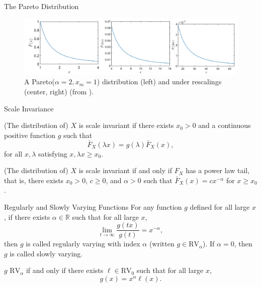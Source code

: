 \documentclass{beamer}
\def\R{\mathbb R}
\def\RV{\text{RV}}
\begin{document}
\begin{frame}{The Pareto Distribution}
    \begin{figure}[h!]
        \centering
        \includegraphics[scale=0.3]{scaled_paretos.png}
        \caption{A Pareto($\alpha = 2, x_m = 1$) distribution (left) and under rescalings (center, right) (from \cite{nair2022thef}).}
        \label{fig:scaled_paretos}
    \end{figure}
\end{frame}

\begin{frame}{Scale Invariance}
    \begin{definition}
        (The distribution of) $X$ is scale invariant if there exists $x_0 > 0$ and a continuous positive function $g$ such that
        \[
        \bar{F}_X(\lambda x) = g(\lambda)\bar{F}_X(x),
        \]
        for all $x, \lambda$ satisfying $x, \lambda x \ge x_0$.
    \end{definition}
    \begin{theorem}
        (The distribution of) $X$ is scale invariant if and only if $F_X$ has a power law tail, that is, there exists $x_0 > 0$, $c \ge 0$, and $\alpha > 0$ such that $\bar{F}_X(x) = c x^{-\alpha}$ for $x \ge x_0$.
    \end{theorem}
\end{frame}

\begin{frame}{Regularly and Slowly Varying Functions}
    For any function $g$ defined for all large $x$, if there exists $\alpha \in \R$ such that for all large $x$,
    \[
    \lim_{t \to \infty} \frac{g(t x)}{g(t)} = x^{-\alpha},
    \]
    then $g$ is called regularly varying with index $\alpha$ (written $g \in \RV_{\alpha}$). If $\alpha = 0$, then $g$ is called slowly varying.
    \begin{theorem}
        $g$ \in $\RV_{\alpha}$ if and only if there exists $\ell \in \RV_0$ such that for all large $x$,
        \[
        g(x) = x^{\alpha}\ell(x).
        \]
    \end{theorem}
\end{frame}
\end{document}
